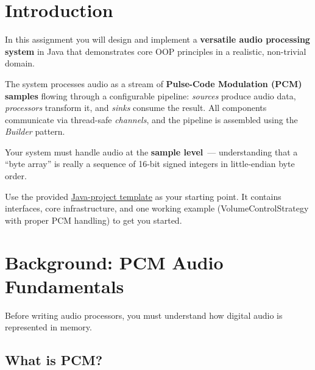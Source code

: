 \documentclass[a4paper,12pt]{article}
\begin{document}
\begin{center}
\end{center}

\section{Introduction}

In this assignment you will design and implement a \textbf{versatile audio processing system} in Java
that demonstrates core OOP principles in a realistic, non-trivial domain.

The system processes audio as a stream of \textbf{Pulse-Code Modulation (PCM) samples} flowing through a configurable pipeline:
\textit{sources} produce audio data, \textit{processors} transform it,
and \textit{sinks} consume the result. All components communicate via thread-safe
\textit{channels}, and the pipeline is assembled using the \textit{Builder} pattern.

Your system must handle audio at the \textbf{sample level}~--- understanding
that a ``byte array'' is really a sequence of 16-bit signed integers in little-endian byte order.

Use the provided \href{https://github.com/CSAI-programming-paradigms/oop_project}{Java-project template}
as your starting point. It contains interfaces, core infrastructure, and one working example
(VolumeControlStrategy with proper PCM handling) to get you started.


\section{Background: PCM Audio Fundamentals}

Before writing audio processors, you must understand how digital audio is represented in memory.

\subsection{What is PCM?}
\end{document}
